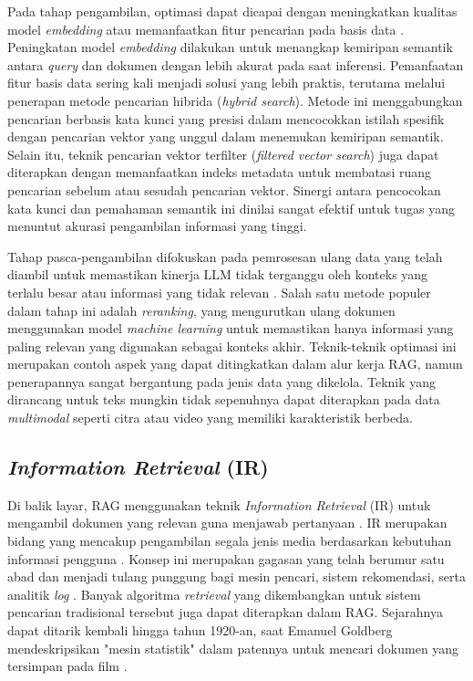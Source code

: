 Pada tahap pengambilan, optimasi dapat dicapai dengan meningkatkan kualitas model \textit{embedding} atau memanfaatkan fitur pencarian pada basis data \parencite{iusztinLLMEngineersHandbook2024}. Peningkatan model \textit{embedding} dilakukan untuk menangkap kemiripan semantik antara \textit{query} dan dokumen dengan lebih akurat pada saat inferensi. Pemanfaatan fitur basis data sering kali menjadi solusi yang lebih praktis, terutama melalui penerapan metode pencarian hibrida (\textit{hybrid search}). Metode ini menggabungkan pencarian berbasis kata kunci yang presisi dalam mencocokkan istilah spesifik dengan pencarian vektor yang unggul dalam menemukan kemiripan semantik. Selain itu, teknik pencarian vektor terfilter (\textit{filtered vector search}) juga dapat diterapkan dengan memanfaatkan indeks metadata untuk membatasi ruang pencarian sebelum atau sesudah pencarian vektor. Sinergi antara pencocokan kata kunci dan pemahaman semantik ini dinilai sangat efektif untuk tugas yang menuntut akurasi pengambilan informasi yang tinggi.

Tahap pasca-pengambilan difokuskan pada pemrosesan ulang data yang telah diambil untuk memastikan kinerja LLM tidak terganggu oleh konteks yang terlalu besar atau informasi yang tidak relevan \parencite{iusztinLLMEngineersHandbook2024}. Salah satu metode populer dalam tahap ini adalah \textit{reranking}, yang mengurutkan ulang dokumen menggunakan model \textit{machine learning} untuk memastikan hanya informasi yang paling relevan yang digunakan sebagai konteks akhir. Teknik-teknik optimasi ini merupakan contoh aspek yang dapat ditingkatkan dalam alur kerja RAG, namun penerapannya sangat bergantung pada jenis data yang dikelola. Teknik yang dirancang untuk teks mungkin tidak sepenuhnya dapat diterapkan pada data \textit{multimodal} seperti citra atau video yang memiliki karakteristik berbeda.

\subsection{\textit{Information Retrieval} (IR)}
Di balik layar, RAG menggunakan teknik \textit{Information Retrieval} (IR) untuk mengambil dokumen yang relevan guna menjawab pertanyaan \parencite{huyenAIEngineeringBuilding2025}. IR merupakan bidang yang mencakup pengambilan segala jenis media berdasarkan kebutuhan informasi pengguna \parencite{jm3}. Konsep ini merupakan gagasan yang telah berumur satu abad dan menjadi tulang punggung bagi mesin pencari, sistem rekomendasi, serta analitik \textit{log} \parencite{huyenAIEngineeringBuilding2025}. Banyak algoritma \textit{retrieval} yang dikembangkan untuk sistem pencarian tradisional tersebut juga dapat diterapkan dalam RAG. Sejarahnya dapat ditarik kembali hingga tahun 1920-an, saat Emanuel Goldberg mendeskripsikan "mesin statistik" dalam patennya untuk mencari dokumen yang tersimpan pada film \parencite{al-aminHistoryGenerativeArtificial2024}. 

